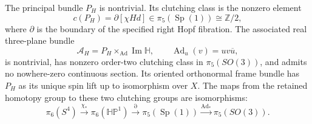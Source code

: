 \begin{theorem}
\label{h24:rettri:bundleclass}
The principal bundle $P_H$ is nontrivial. Its clutching class is the
nonzero element
\begin{equation}
 c(P_H)=\partial[\chi H d]\in\pi_5(\operatorname{Sp}(1))
                  \cong\mathbb Z/2,
 \label{h24:rettri:clutch}
\end{equation}
where $\partial$ is the boundary of the specified right Hopf fibration.
The associated real three-plane bundle
\begin{equation}
 \mathcal A_H=P_H\times_{\operatorname{Ad}}\operatorname{Im}\mathbb H,
 \qquad \operatorname{Ad}_u(v)=uv\overline u,
 \label{h24:rettri:rankthree}
\end{equation}
is nontrivial, has nonzero order-two clutching class in
$\pi_5(SO(3))$, and admits no nowhere-zero continuous section.
Its oriented orthonormal frame bundle has $P_H$ as its unique spin lift
up to isomorphism over $X$. The maps from the retained homotopy group
to these two clutching groups are isomorphisms:
\begin{equation}
 \pi_6(S^4)\xrightarrow{\chi_*}\pi_6(\mathbb H\mathbb P^1)
 \xrightarrow{\partial}\pi_5(\operatorname{Sp}(1))
 \xrightarrow{\operatorname{Ad}_*}\pi_5(SO(3)).
 \label{h24:rettri:exact-detection}
\end{equation}
\end{theorem}


